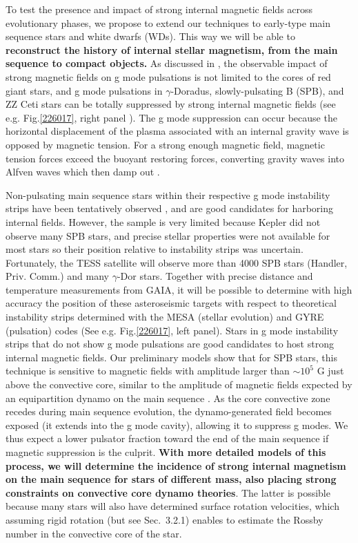 To test the presence and impact of strong internal magnetic fields across evolutionary phases,
we propose to extend our techniques to early-type main sequence stars and white dwarfs (WDs). This way we will be able to \textbf{reconstruct the history of internal stellar magnetism, from the main sequence to compact objects.} As discussed in \citet{Cantiello_2016}, the observable impact of strong magnetic fields on g mode pulsations is not limited to the cores of red giant stars, and g mode pulsations in $\gamma$-Doradus, slowly-pulsating B (SPB), and ZZ Ceti stars can be totally suppressed by strong internal magnetic fields (see e.g. Fig.\ref{226017}, right panel ). The g mode suppression can occur because the horizontal displacement of the plasma associated with an internal gravity wave is opposed by magnetic tension. For a strong enough magnetic field, magnetic tension forces exceed the buoyant restoring forces, converting gravity waves into Alfven waves which then damp out \cite{lecoanet:17}.

Non-pulsating main sequence stars within their respective g mode instability strips have been tentatively observed \citep{Balona_2011}, and are good candidates for harboring internal fields.
However, the sample is very limited because Kepler did not observe many SPB stars, and precise stellar properties were not available for most stars so their position relative to instability strips was uncertain. Fortunately, the TESS satellite will observe more than 4000 SPB stars (Handler, Priv. Comm.) and many $\gamma$-Dor stars. Together with precise distance and temperature measurements from GAIA, it will be possible to determine with high accuracy the position of these asteroseismic targets with respect to theoretical instability strips determined with the MESA (stellar evolution) and GYRE (pulsation) codes (See e.g. Fig.\ref{226017}, left panel). Stars in g mode instability strips that do not show g mode pulsations are good candidates to host strong internal magnetic fields. Our preliminary models show that for SPB stars, this technique is sensitive to magnetic fields with amplitude larger than $\sim \! 10^5$ G just above the convective core, similar to the amplitude of magnetic fields expected by an equipartition dynamo on the main sequence \citep[See e.g.][]{Featherstone_2009,Augustson_2016}. As the core convective zone recedes during main sequence evolution, the dynamo-generated field becomes exposed (it extends into the g mode cavity), allowing it to suppress g modes. We thus expect a lower pulsator fraction toward the end of the main sequence if magnetic suppression is the culprit. \textbf{With more detailed models of this process, we will determine the incidence of strong internal magnetism on the main sequence for stars of different mass, also placing strong constraints on convective core dynamo theories}. The latter is possible because many stars will also have determined surface rotation velocities, which assuming rigid rotation (but see Sec.~3.2.1) enables to estimate the Rossby number in the convective core of the star.

